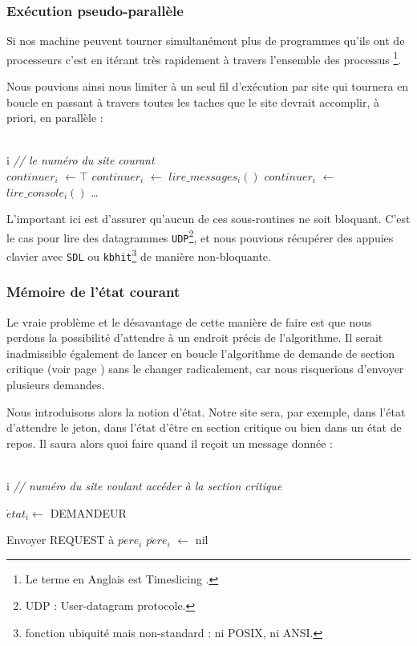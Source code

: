 \subsubsection{Exécution pseudo-parallèle}

Si nos machine peuvent tourner \og simultanément \fg{} plus de programmes qu'ils ont de processeurs c'est en itérant très rapidement à travers l'ensemble des processus \footnote { Le terme en Anglais est \og Timeslicing \fg{}.}. 

Nous pouvions ainsi nous limiter à un seul fil d'exécution par site qui tournera en boucle en passant à travers toutes les taches que le site devrait accomplir, à priori, en parallèle :

\begin{algorithm}[H]
  \caption{$Boucle_i()$}
  \Donnees
  {\\
    i \textit{// le numéro du site courant}\\
  }
  \Deb
  {
  	$continuer_i$ $\leftarrow \top$ \;
	 {
	 	$continuer_i$ $\leftarrow$ $lire\_messages_i()$ \;
	 	$continuer_i$ $\leftarrow$ $lire\_console_i()$ \;
	 	\dots \;
	 }
  }	
\end{algorithm}

L'important ici est d'assurer qu'aucun de ces sous-routines ne soit bloquant. C'est le cas pour lire des datagrammes \texttt{UDP}\footnote{UDP : User-datagram protocole. }, et nous pouvions récupérer des appuies clavier avec \texttt{SDL} ou \texttt{kbhit}\footnote{fonction ubiquité mais non-standard : ni POSIX, ni ANSI.} de manière non-bloquante.

\subsubsection{Mémoire de l'état courant}
Le vraie problème et le désavantage de cette manière de faire est que nous perdons la possibilité d'attendre à un endroit précis de l'algorithme. Il serait inadmissible également de lancer en boucle l'algorithme de demande de section critique (voir page \pageref{nt_wait}) sans le changer radicalement, car nous risquerions d'envoyer plusieurs demandes. 

Nous introduisons alors la notion d'état. Notre site sera, par exemple, dans l'état d'attendre le jeton, dans l'état d'être en section critique ou bien dans un état de repos. Il saura alors quoi faire quand il reçoit un message donnée :

\begin{algorithm}[H]
  \caption{$Supplier^{\prime}_i$()}
  \label{nt_wait}
  \Donnees
  {\\
    i \textit{// numéro du site voulant accéder à la section critique}\\
  }
  \Deb
  {
	$\acute{e}tat_i \leftarrow$ DEMANDEUR \;  
  
  	{
  		Envoyer REQUEST à $p\grave{e}re_i$ \;
  		$p\grave{e}re_i$ $\leftarrow$ nil \;
  	}
  }	
\end{algorithm}

